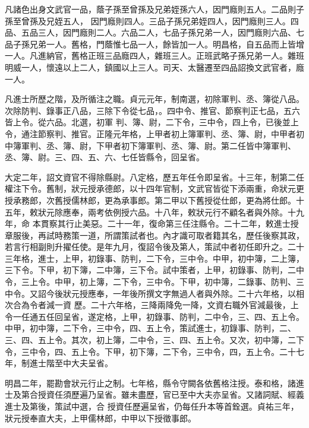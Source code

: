 \begin{pinyinscope}
 凡諸色出身文武官一品，蔭子孫至曾孫及兄弟姪孫六人，因門廕則五人。二品則子孫至曾孫及兄姪五人，
 因門廕則四人。三品子孫兄弟姪四人，因門廕則三人。四品、五品三人，因門廕則二人。六品二人，七品子孫兄弟一人，因門廕則六品、七品子孫兄弟一人。舊格，門蔭惟七品一人，餘皆加一人。明昌格，自五品而上皆增一人。凡進納官，舊格正班三品廕四人，雜班三人。正班武略子孫兄弟一人。雜班明威一人，懷遠以上二人，鎮國以上三人。司天、太醫遷至四品詔換文武官者，廕一人。



 凡進士所歷之階，及所循注之職。貞元元年，制南選，初除軍判、丞、簿從八品。次除防判、錄事正八品，三除下令從七品，。四中令、推官、節察判正七品，五六皆上令。從六品。北選，初軍
 判、簿、尉，二下令，三中令，四上令，已後並上令，通注節察判、推官。正隆元年格，上甲者初上簿軍判、丞、簿、尉，中甲者初中簿軍判、丞、簿、尉，下甲者初下簿軍判、丞、簿、尉。第二任皆中簿軍判、丞、簿、尉。三、四、五、六、七任皆縣令，回呈省。



 大定二年，詔文資官不得除縣尉。八定格，歷五年任令即呈省。十三年，制第二任權注下令。舊制，狀元授承德郎，以十四年官制，文武官皆從下添兩重，命狀元更授承務郎，次舊授儒林郎，更為承事郎。第二甲以下舊授從仕郎，更為將仕郎。十五年，敕狀元除應奉，兩考依例授六品。十八年，敕狀元行不顧名者與外除。十九年，命
 本貫察其行止美惡。二十一年，復命第三任注縣令。二十二年，敕進士授章服後，再試時務策一道，所謂策試者也。內才識可取者籍其名，歷任後察其政，若言行相副則升擢任使。是年九月，復詔令後及第人，策試中者初任即升之。二十三年格，進士，上甲，初錄事、防判，二下令，三中令。中甲，初中簿，二上簿，三下令。下甲，初下簿，二中簿，三下令。試中策者，上甲，初錄事、防判，二中令，三上令。中甲，初上簿，二下令，三中令。下甲，初中簿，二錄事、防判、三中令。又詔今後狀元授應奉，一年後所撰文字無過人者與外除。二十六年格，以相次合為令者減一資
 歷。二十六年格，三降兩降免一降，文資右職外官減最後，上令一任通五任回呈省，遂定格，上甲，初錄事、防判，二中令，三、四、五上令。中甲，初中簿，二下令，三中令，四、五上令，策試進士，初錄事、防判，二、三、四、五上令。其次，初上簿，二中令，三、四、五上令。又次，初中簿，二下令，三中令，四、五上令。下甲，初下簿，二下令，三中令，四，五上令。二十七年，制進士階至中大夫呈省。



 明昌二年，罷勘會狀元行止之制。七年格，縣令守闕各依舊格注授。泰和格，諸進士及第合授資任須歷遍乃呈省。雖未盡歷，官已至中大夫亦呈省。又諸詞賦、經義進士及第後，策試中選，合
 授資任歷遍呈省，仍每任升本等首銓選。貞祐三年，狀元授奉直大夫，上甲儒林郎，中甲以下授徵事郎。




\end{pinyinscope}
